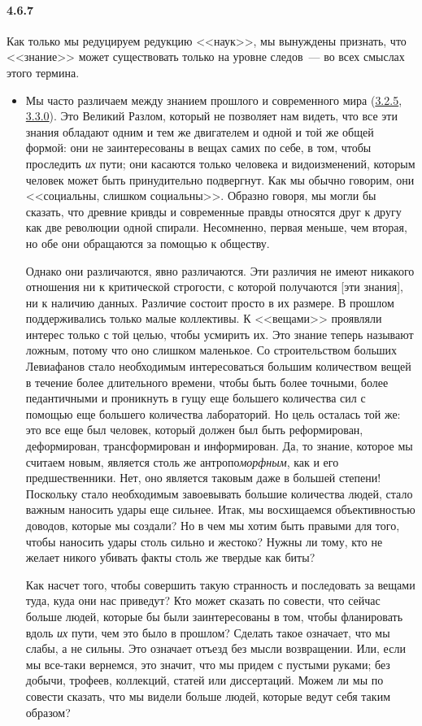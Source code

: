 \paragraph{4.6.7}\hypertarget{par:4.6.7}{} Как только мы редуцируем редукцию <<наук>>, мы вынуждены признать, что <<знание>> может существовать только на уровне следов~--- во всех смыслах этого термина. 
	\begin{itemize}
	\item 
	Мы часто различаем между знанием прошлого и современного мира (\hyperlink{par:3.2.5}{3.2.5}, \hyperlink{par:3.3.0}{3.3.0}). Это Великий Разлом, который не позволяет нам видеть, что все эти знания обладают одним и тем же двигателем и одной и той же общей формой: они не заинтересованы в вещах самих по себе, в том, чтобы проследить {\itshape их} пути; они касаются только человека и видоизменений, которым человек может быть принудительно подвергнут. Как мы обычно говорим, они <<социальны, слишком социальны>>. Образно говоря, мы могли бы сказать, что древние кривды и современные правды относятся друг к другу как две революции одной спирали. Несомненно, первая меньше, чем вторая, но обе они обращаются за помощью к обществу. 

	Однако они различаются, явно различаются. Эти различия не имеют никакого отношения ни к критической строгости, с которой получаются [эти знания], ни к наличию данных. Различие состоит просто в их размере. В прошлом поддерживались только малые коллективы. К <<вещами>> проявляли интерес только с той целью, чтобы усмирить их. Это знание теперь называют ложным, потому что оно слишком маленькое. Со строительством больших Левиафанов стало необходимым интересоваться большим количеством вещей в течение более длительного времени, чтобы быть более точными, более педантичными и проникнуть в гущу еще большего количества сил с помощью еще большего количества лабораторий. Но цель осталась той же: это все еще был человек, который должен был быть реформирован, деформирован, трансформирован и информирован. Да, то знание, которое мы считаем новым, является столь же антропо{\itshape{морфным}}, как и его предшественники. Нет, оно является таковым даже в большей степени! Поскольку стало необходимым завоевывать большие количества людей, стало важным наносить удары еще сильнее. Итак, мы восхищаемся объективностью доводов, которые мы создали? Но в чем мы хотим быть правыми для того, чтобы наносить удары столь сильно и жестоко? Нужны ли тому, кто не желает никого убивать факты столь же твердые как биты? 

	Как насчет того, чтобы совершить такую странность и последовать за вещами туда, куда они нас приведут? Кто может сказать по совести, что сейчас больше людей, которые бы были заинтересованы в том, чтобы фланировать вдоль {\itshape их} пути, чем это было в прошлом? Сделать такое означает, что мы слабы, а не сильны. Это означает отъезд без мысли возвращении. Или, если мы все-таки вернемся, это значит, что мы придем с пустыми руками; без добычи, трофеев, коллекций, статей или диссертаций. Можем ли мы по совести сказать, что мы видели больше людей, которые ведут себя таким образом? 


\end{itemize}
